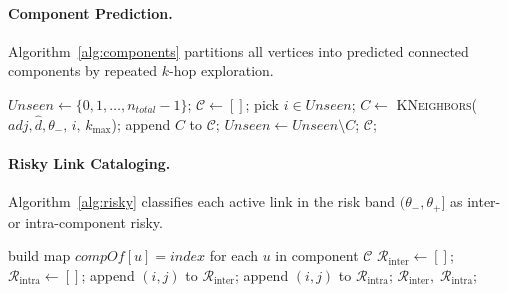 \documentclass[preprint,12pt]{elsarticle}
\theoremstyle{definition}\newtheorem{definition}{Definition}
\theoremstyle{plain}\newtheorem{theorem}{Theorem}
\theoremstyle{plain}\newtheorem{lemma}{Lemma}
\theoremstyle{plain}\newtheorem{corollary}{Corollary}
\theoremstyle{plain}\newtheorem{assumption}{Assumption}
\theoremstyle{remark}\newtheorem{remark}[theorem]{Remark}
\begin{document}
\paragraph{Component Prediction.}
Algorithm~\ref{alg:components} partitions all vertices into predicted connected components by repeated $k$-hop exploration.

\begin{algorithm}[H]\small
  \caption{\textsc{PredictComponents}}
  \label{alg:components}
  \begin{algorithmic}[1]
    \State $Unseen \gets \{0,1,\dots,n_{total}-1\}$; $\mathcal C \gets []$;
      \State pick $i \in Unseen$;
      \State $C \gets$ \textsc{KNeighbors}($adj, \widehat d, \theta_- ,\,i,\,k_{\max}$);
      \State append $C$ to $\mathcal C$;
      \State $Unseen \gets Unseen \setminus C$;
    \EndWhile
    \State \Return $\mathcal C$;
  \end{algorithmic}
\end{algorithm}
\paragraph{Risky Link Cataloging.}
Algorithm~\ref{alg:risky} classifies each active link in the risk band $(\theta_-,\theta_+]$ as inter- or intra-component risky.

\begin{algorithm}[H]\small
  \caption{\textsc{CatalogueRiskyLinks}}
  \label{alg:risky}
  \begin{algorithmic}[1]
    \State build map $compOf[u] = index$ for each $u$ in component $\mathcal C$
    \State $\mathcal R_{\mathrm{inter}} \gets []$; $\mathcal R_{\mathrm{intra}} \gets []$;
       
          \State append $(i,j)$ to $\mathcal R_{\mathrm{inter}}$;
        \Else
          \State append $(i,j)$ to $\mathcal R_{\mathrm{intra}}$;
        \EndIf
      \EndIf
    \EndFor
    \State \Return $\mathcal R_{\mathrm{inter}},\;\mathcal R_{\mathrm{intra}}$;
  \end{algorithmic}
\end{algorithm}
\end{document}
